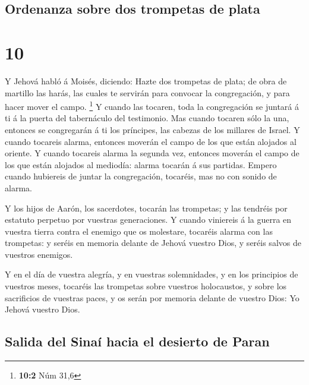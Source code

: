 \hypertarget{ordenanza-sobre-dos-trompetas-de-plata}{%
\subsection{Ordenanza sobre dos trompetas de
plata}\label{ordenanza-sobre-dos-trompetas-de-plata}}

\hypertarget{section-9}{%
\section{10}\label{section-9}}

 Y Jehová habló á Moisés, diciendo:  Hazte
dos trompetas de plata; de obra de martillo las harás, las cuales te
servirán para convocar la congregación, y para hacer mover el campo.
\footnote{\textbf{10:2} Núm 31,6}  Y cuando las tocaren,
toda la congregación se juntará á ti á la puerta del tabernáculo del
testimonio.  Mas cuando tocaren sólo la una, entonces se
congregarán á ti los príncipes, las cabezas de los millares de Israel.
 Y cuando tocareis alarma, entonces moverán el campo de
los que están alojados al oriente.  Y cuando tocareis
alarma la segunda vez, entonces moverán el campo de los que están
alojados al mediodía: alarma tocarán á sus partidas. 
Empero cuando hubiereis de juntar la congregación, tocaréis, mas no con
sonido de alarma.

 Y los hijos de Aarón, los sacerdotes, tocarán las
trompetas; y las tendréis por estatuto perpetuo por vuestras
generaciones.  Y cuando viniereis á la guerra en vuestra
tierra contra el enemigo que os molestare, tocaréis alarma con las
trompetas: y seréis en memoria delante de Jehová vuestro Dios, y seréis
salvos de vuestros enemigos.

 Y en el día de vuestra alegría, y en vuestras
solemnidades, y en los principios de vuestros meses, tocaréis las
trompetas sobre vuestros holocaustos, y sobre los sacrificios de
vuestras paces, y os serán por memoria delante de vuestro Dios: Yo
Jehová vuestro Dios.

\hypertarget{salida-del-sinauxed-hacia-el-desierto-de-paran}{%
\subsection{Salida del Sinaí hacia el desierto de
Paran}\label{salida-del-sinauxed-hacia-el-desierto-de-paran}}

